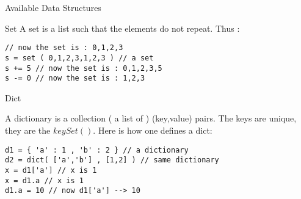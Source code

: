 \begin{section}{Available Data Structures}
\begin{subsection}{Set}
A set is a list such that the elements do not repeat.
Thus :

\begin{lstlisting}[style=JexlStyle]
// now the set is : 0,1,2,3
s = set ( 0,1,2,3,1,2,3 ) // a set  
s += 5 // now the set is : 0,1,2,3,5 
s -= 0 // now the set is : 1,2,3
\end{lstlisting}
\end{subsection}

\begin{subsection}{Dict}

A dictionary is a collection ( a list of ) (key,value) pairs.
The keys are unique, they are the $keySet()$. Here is how one defines a dict:

\begin{lstlisting}[style=JexlStyle]
d1 = { 'a' : 1 , 'b' : 2 } // a dictionary   
d2 = dict( ['a','b'] , [1,2] ) // same dictionary  
x = d1['a'] // x is 1
x = d1.a // x is 1 
d1.a = 10 // now d1['a'] --> 10 
\end{lstlisting}

\end{subsection}

\end{section}

